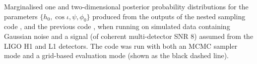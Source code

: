 \label{fig:simsignal_multi}
Marginalised one and two-dimensional posterior probability distributions
for the parameters $\{h_0, \cos{\iota}, \psi, \phi_0\}$
produced from the outputs of the nested sampling code \lppen, and the previous
code \lppe, when running on simulated data containing Gaussian noise and a signal 
(of coherent multi-detector SNR 8) assumed from the LIGO H1 and L1 detectors. The \lppe code was run with both an MCMC sampler mode and a grid-based
evaluation mode (shown as the black dashed line).
